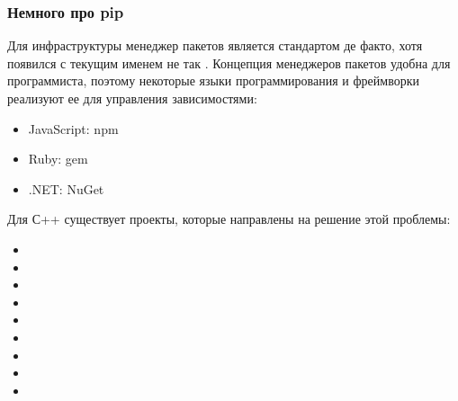 \documentclass[letterpaper,10pt,russian]{sphinxmanual}
\begin{document}
\subsubsection{Немного про pip}
\label{\detokenize{educational_materials/packaging/content:pip}}
\sphinxAtStartPar
Для инфраструктуры  менеджер пакетов  является стандартом де факто, хотя появился с текущим именем не так . Концепция менеджеров пакетов удобна для программиста, поэтому некоторые языки программирования и фреймворки реализуют ее для управления зависимостями:
\begin{itemize}
\item {} 
\sphinxAtStartPar
JavaScript: npm

\item {} 
\sphinxAtStartPar
Ruby: gem

\item {} 
\sphinxAtStartPar
.NET: NuGet

\end{itemize}

\sphinxAtStartPar
Для С++ существует проекты, которые направлены на решение этой проблемы:
\begin{itemize}
\item {} 
\sphinxAtStartPar
{}

\item {} 
\sphinxAtStartPar
{}

\item {} 
\sphinxAtStartPar
{}

\item {} 
\sphinxAtStartPar
{}

\item {} 
\sphinxAtStartPar
{}

\item {} 
\sphinxAtStartPar
{}

\item {} 
\sphinxAtStartPar
{}

\item {} 
\sphinxAtStartPar
{}

\item {} 
\sphinxAtStartPar
{}

\end{itemize}
\end{document}
